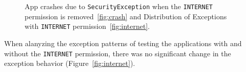 \begin{figure}[h!]
\hfill
{}
\hfill
\caption{App crashes due to \texttt{SecurityException} when the \texttt{INTERNET} permission is removed~\ref{fig:crash} and Distribution of Exceptions with \texttt{INTERNET} permission~\ref{fig:internet}.}
\end{figure}
When alanyzing the exception patterns of testing the applications with and without the \texttt{INTERNET} permission, there was no significant change in the exception behavior (Figure~\ref{fig:internet}). 



